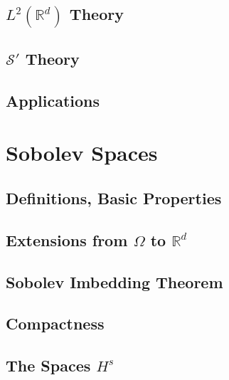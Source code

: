 \documentclass[letterpaper,twoside,12pt]{article}
\theoremstyle{mystyle}
\newcommand{\R}{{\mathbb R}}
\newcommand{\ScS}{\mathcal S}
\begin{document}
\subsection{$L^2\left( \R^d \right)$ Theory}

\subsection{$\ScS'$ Theory}

\subsection{Applications}











































\newpage\section{Sobolev Spaces}
\subsection{Definitions, Basic Properties}
\subsection{Extensions from $\Omega$ to $\R^d$}
\subsection{Sobolev Imbedding Theorem}
\subsection{Compactness}
\subsection{The Spaces $H^s$}
\end{document}
